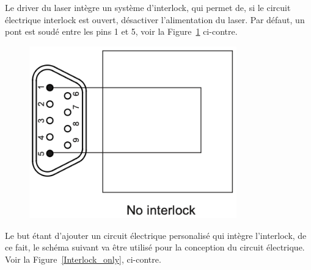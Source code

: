 \begin{minipage}[c]{0.6\textwidth}
    Le driver du laser intègre un système d'interlock, qui permet de, si le circuit électrique interlock est ouvert, désactiver l'alimentation du laser. Par défaut, un pont est soudé entre les pins 1 et 5, voir la Figure~\ref{No_interlock} ci-contre.
\end{minipage}\hfill
\begin{minipage}[c]{0.35\textwidth}
    \begin{figure}[H]
        \begin{center}
            \includegraphics[width=0.8\textwidth]{assets/figures/Protections_laser/no_interlock.png}
        \end{center}
        \label{No_interlock}
    \end{figure}
\end{minipage}
\begin{minipage}[c]{0.6\textwidth}
    Le but étant d'ajouter un circuit électrique personalisé qui intègre l'interlock, de ce fait, le schéma suivant va être utilisé pour la conception du circuit électrique. Voir la Figure~\ref{Interlock_only}, ci-contre.
\end{minipage}\hfill
